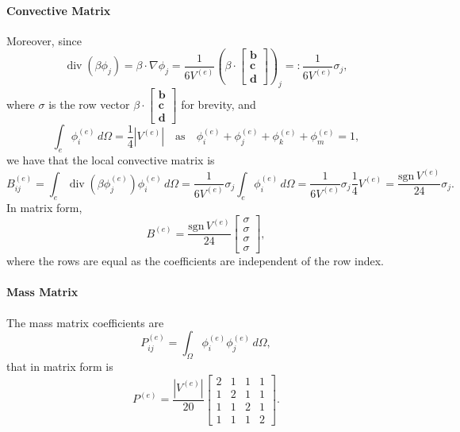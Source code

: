 \documentclass[hidelinks]{article}
\DeclareMathOperator{\divg}{div}
\begin{document}
\paragraph{Convective Matrix}
Moreover, since \[
\divg (\beta \phi_j) = \beta \cdot \nabla \phi_j = \frac{1}{6V^{(e)}}\left(\beta \cdot \begin{bmatrix}
    \mathbf{b} \\
    \mathbf{c} \\
    \mathbf{d}
\end{bmatrix} \right)_j =: \frac{1}{6V^{(e)}} \sigma_j,
\] 
where $\sigma$ is the row vector $\beta \cdot \begin{bmatrix}
    \mathbf{b} \\
    \mathbf{c} \\
    \mathbf{d}
\end{bmatrix}$ for brevity, and
\[
\int_e \phi^{(e)}_i \, d\Omega = \frac{1}{4} |V^{(e)}| \quad \text{as} \quad \phi^{(e)}_i + \phi^{(e)}_j + \phi^{(e)}_k + \phi^{(e)}_m= 1,
\]
we have that the local convective matrix is
\[
B_{ij}^{(e)} = \int_e \divg (\beta \phi^{(e)}_j) \phi^{(e)}_i \, d\Omega = \frac{1}{6V^{(e)}}\sigma_j \int_e \phi^{(e)}_i \, d\Omega = \frac{1}{6V^{(e)}}\sigma_j \frac{1}{4} V^{(e)} = \frac{\text{sgn}\, V^{(e)}}{24} \sigma_j.
\]
In matrix form,
\[
B^{(e)} = \frac{\text{sgn}\, V^{(e)}}{24} \begin{bmatrix} \sigma \\ \sigma \\ \sigma \\ \sigma
\end{bmatrix},
\]
where the rows are equal as the coefficients are independent of the row index.

\paragraph{Mass Matrix} 
The mass matrix coefficients are
\[
P^{(e)}_{ij} = \int_\Omega\phi^{(e)}_i\phi^{(e)}_j\,d\Omega,
\]
that in matrix form is
\[
P^{(e)} = \frac{|V^{(e)}|}{20}\begin{bmatrix}
    2 & 1 & 1 & 1 \\ 1 & 2 & 1 & 1 \\ 1 & 1 & 2 & 1 \\ 1 & 1 & 1 & 2
\end{bmatrix}.
\]  
\end{document}
